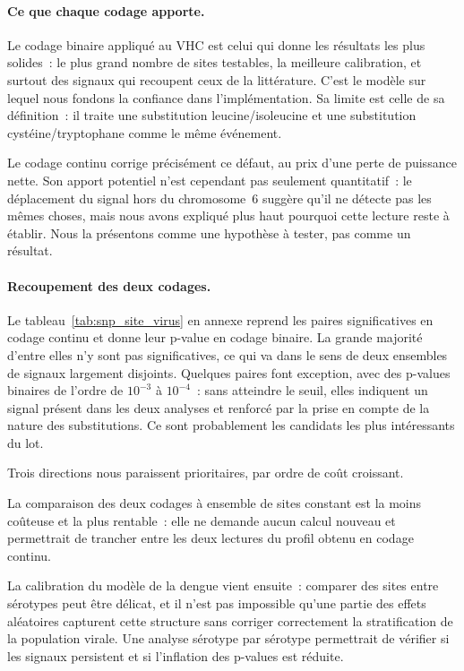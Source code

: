 \documentclass[11pt,a4paper]{article}
\begin{document}
\paragraph{Ce que chaque codage apporte.}
Le codage binaire appliqué au VHC est celui qui donne les résultats les plus solides~: le plus
grand nombre de sites testables, la meilleure calibration, et surtout des signaux qui recoupent
ceux de la littérature. C'est le modèle sur lequel nous fondons la confiance dans
l'implémentation. Sa limite est celle de sa définition~: il traite une substitution
leucine/isoleucine et une substitution cystéine/tryptophane comme le même événement.
 
Le codage continu corrige précisément ce défaut, au prix d'une perte de puissance nette. Son
apport potentiel n'est cependant pas seulement quantitatif~: le déplacement du signal hors du
chromosome~6 suggère qu'il ne détecte pas les mêmes choses, mais nous avons expliqué plus haut
pourquoi cette lecture reste à établir. Nous la présentons comme une hypothèse à tester, pas comme
un résultat.
 
\paragraph{Recoupement des deux codages.}
Le tableau~\ref{tab:snp_site_virus} en annexe reprend les paires significatives en codage
continu et donne leur p-value en codage binaire. La grande majorité d'entre elles n'y sont pas
significatives, ce qui va dans le sens de deux ensembles de signaux largement disjoints. Quelques
paires font exception, avec des p-values binaires de l'ordre de $10^{-3}$ à $10^{-4}$~: sans
atteindre le seuil, elles indiquent un signal présent dans les deux analyses et renforcé par la
prise en compte de la nature des substitutions. Ce sont probablement les candidats les plus
intéressants du lot.

 
\vspace{1cm}
Trois directions nous paraissent prioritaires, par ordre de coût croissant.
 
La comparaison des deux codages à ensemble de sites constant est la moins coûteuse et la plus
rentable~: elle ne demande aucun calcul nouveau et permettrait de trancher entre les deux lectures
du profil obtenu en codage continu.
 
La calibration du modèle de la dengue vient ensuite~: comparer des sites entre sérotypes peut être délicat,
et il n'est pas impossible qu'une partie des effets aléatoires capturent cette structure sans corriger correctement
la stratification de la population virale. Une analyse sérotype par sérotype permettrait de vérifier si les signaux persistent et si l'inflation des p-values est réduite.
 
\end{document}
